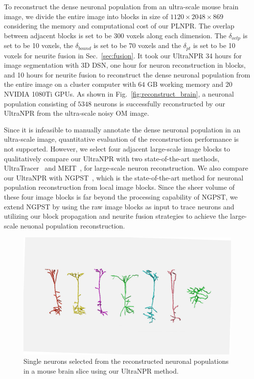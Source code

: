 To reconstruct the dense neuronal population from an ultra-scale mouse brain image, we divide the entire image into blocks in size of $1120\times 2048\times 869$ considering the memory and computational cost of our PLNPR.
%
The overlap between adjacent blocks is set to be $300$ voxels along each dimension. 
The $\delta_{ovlp}$ is set to be 10 voxels, the $\delta_{bound}$ is set to be 70 voxels and the $\delta_{pt}$ is set to be 10 voxels for neurite fusion in Sec.~\ref{sec:fusion}.
%
It took our UltraNPR 34 hours for image segmentation with 3D DSN, one hour for neuron reconstruction in blocks, and 10 hours for neurite fusion to reconstruct the dense neuronal population from the entire image on a cluster computer with $64$ GB working memory and 20 NVIDIA 1080Ti GPUs.
%
As shown in Fig.~\ref{fig:reconstruct_brain}, a neuronal population consisting of $5348$ neurons is successfully reconstructed by our UltraNPR from the ultra-scale noisy OM image. 


Since it is infeasible to manually annotate the dense neuronal population in an ultra-scale image, quantitative evaluation of the reconstruction performance is not supported.
%
However, we select four adjacent large-scale image blocks to qualitatively compare our UltraNPR with two state-of-the-art methods, UltraTracer~\cite{Peng2017} and MEIT~\cite{Wang2018}, for large-scale neuron reconstruction.
We also compare our UltraNPR with NGPST~\cite{Quan2015}, which is the state-of-the-art method for neuronal population reconstruction from local image blocks.
Since the sheer volume of these four image blocks is far beyond the processing capability of NGPST, we extend NGPST by using the raw image blocks as input to trace neurons and utilizing our block propagation and neurite fusion strategies to achieve the large-scale neuonal population reconstruction.
%


\begin{figure}[t]
	\centering
	\includegraphics[width=\columnwidth]{./Illustrations/single_neurons4.pdf}
	\caption{Single neurons selected from the reconstructed neuronal populations in a mouse brain slice using our UltraNPR method.}
	\label{fig:single_neurons}
\end{figure}

